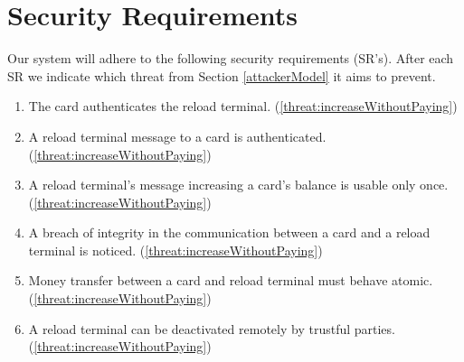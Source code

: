 \section{Security Requirements}
Our system will adhere to the following security requirements (SR's). After each SR we indicate which threat from Section \ref{attackerModel} it aims to prevent.
\begin{enumerate}[label={SR\arabic*:}, leftmargin=3\parindent]

    \item \label{sr:cardAuthReload}
    The card authenticates the reload terminal. (\ref{threat:increaseWithoutPaying})
    \item \label{sr:reloadCardMessageAuth}
    A reload terminal message to a card is authenticated. (\ref{threat:increaseWithoutPaying})
    \item \label{sr:noReplayLoadingCard}
    A reload terminal's message increasing a card's balance is usable only once. (\ref{threat:increaseWithoutPaying})
    \item \label{sr:cardReloadMessageIntegrity}
    A breach of integrity in the communication between a card and a reload terminal is noticed. (\ref{threat:increaseWithoutPaying})
    \item \label{sr:cardReloadtransterAtomic}
    Money transfer between a card and reload terminal must behave atomic. (\ref{threat:increaseWithoutPaying})
    \item \label{sr:disableReload}
    A reload terminal can be deactivated remotely by trustful parties. (\ref{threat:increaseWithoutPaying})


\end{enumerate}
